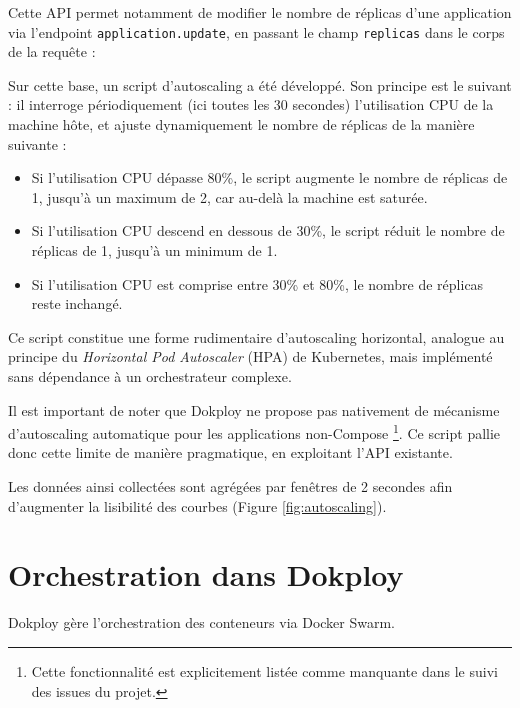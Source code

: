 \documentclass{rapportClass} %
\begin{document}
\smallskip
Cette API permet notamment de modifier le nombre de réplicas d'une
application via l'endpoint \texttt{application.update}, en passant
le champ \texttt{replicas} dans le corps de la requête :

\smallskip
Sur cette base, un script d'autoscaling a été développé. Son
principe est le suivant : il interroge périodiquement (ici toutes les 30 secondes) l'utilisation
CPU de la machine hôte, et ajuste dynamiquement le nombre de réplicas de la manière suivante :
\begin{itemize}
\item Si l'utilisation CPU dépasse 80\%, le script augmente le nombre de réplicas de 1, 
jusqu'à un maximum de 2, car au-delà la machine est saturée.
\item Si l'utilisation CPU descend en dessous de 30\%, le script réduit le nombre de réplicas de 1, 
jusqu'à un minimum de 1.
\item Si l'utilisation CPU est comprise entre 30\% et 80\%, le nombre de réplicas reste inchangé.
\end{itemize}


Ce script constitue une forme rudimentaire d'autoscaling horizontal,
analogue au principe du \textit{Horizontal Pod Autoscaler} (HPA)\cite{Kubernetes2025} de
Kubernetes, mais implémenté sans dépendance à un orchestrateur
complexe.

\smallskip
Il est important de noter que Dokploy ne propose pas nativement de
mécanisme d'autoscaling automatique pour les applications non-Compose
\footnote{Cette fonctionnalité est explicitement listée comme manquante
dans le suivi des issues du projet.}. 
Ce script pallie donc cette limite de manière pragmatique, en exploitant l'API existante.

Les données ainsi collectées sont agrégées par fenêtres de 2 secondes afin d'augmenter la lisibilité des courbes (Figure \ref{fig:autoscaling}).

\section{Orchestration dans Dokploy}
Dokploy gère l'orchestration des conteneurs via Docker Swarm\cite{DockerSwarm2026}.
\end{document}
